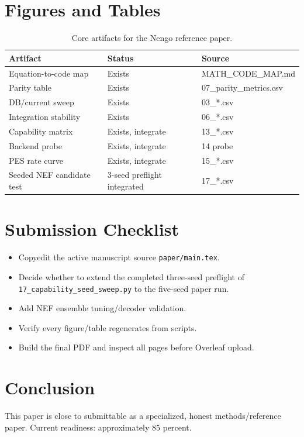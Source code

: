 \documentclass[journal]{IEEEtran}
\begin{document}
\section{Figures and Tables}
\begin{table}[t]
\centering
\caption{Core artifacts for the Nengo reference paper.}
\begin{tabular}{lll}
\toprule
Artifact & Status & Source \\
\midrule
Equation-to-code map & Exists & MATH\_CODE\_MAP.md \\
Parity table & Exists & 07\_parity\_metrics.csv \\
DB/current sweep & Exists & 03\_*.csv \\
Integration stability & Exists & 06\_*.csv \\
Capability matrix & Exists, integrate & 13\_*.csv \\
Backend probe & Exists, integrate & 14 probe \\
PES rate curve & Exists, integrate & 15\_*.csv \\
Seeded NEF candidate test & 3-seed preflight integrated & 17\_*.csv \\
\bottomrule
\end{tabular}
\end{table}

\section{Submission Checklist}
\begin{itemize}
  \item Copyedit the active manuscript source \texttt{paper/main.tex}.
  \item Decide whether to extend the completed three-seed preflight of \texttt{17\_capability\_seed\_sweep.py} to the five-seed paper run.
  \item Add NEF ensemble tuning/decoder validation.
  \item Verify every figure/table regenerates from scripts.
  \item Build the final PDF and inspect all pages before Overleaf upload.
\end{itemize}

\section{Conclusion}
This paper is close to submittable as a specialized, honest methods/reference paper. Current readiness: approximately 85 percent.
\end{document}
